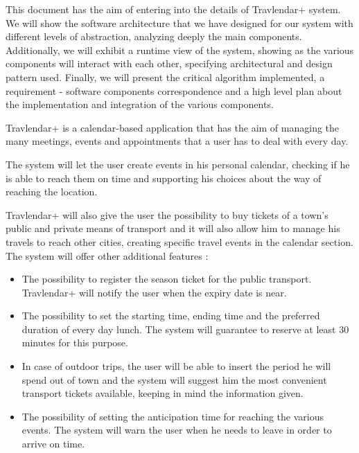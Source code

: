 \vspace*{-5mm}

This document has the aim of entering into the details of Travlendar+ system. 
We will show the software architecture that we have designed for our system with different levels of abstraction, analyzing deeply the main components. 
Additionally, we will exhibit a runtime view of the system, showing as the various components will interact with each other, specifying architectural and design pattern used.
Finally, we will present the critical algorithm implemented, a requirement - software components correspondence and a high level plan about the implementation and integration of the various components.

Travlendar+ is a calendar-based application that has the aim of managing the many meetings, events and appointments that a user has to deal with every day.\par
The system will let the user create events in his personal calendar, checking if he is able to reach them on time and supporting his choices about the way of reaching the location. \par
Travlendar+ will also give the user the possibility to buy tickets of a town’s public and private means of transport and it will also allow him to manage his travels to reach other cities, creating specific travel events in the calendar section.
The system will offer other additional features :
\begin{itemize}
	\setlength{\leftskip}{0.5cm}
	\item The possibility to register the season ticket for the public transport. Travlendar+ will notify the user when the expiry date is near.
	\item The possibility to set the starting time, ending time and the preferred duration of every day lunch. The system will guarantee to reserve at least 30 minutes for this purpose.
	\item In case of outdoor trips, the user will be able to insert the period he will spend out of town and the system will suggest him the most convenient transport tickets available, keeping in mind the information given.
	\item The possibility of setting the anticipation time for reaching the various events. The system will warn the user when he needs to leave in order to arrive on time.
\end{itemize}

